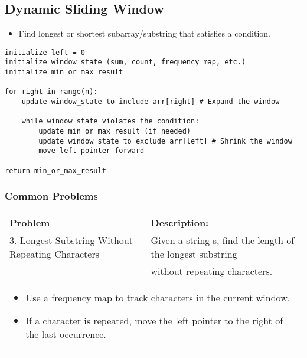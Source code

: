 \subsection{Dynamic Sliding Window}
\begin{summary}
    \begin{itemize}
        \item Find longest or shortest subarray/substring that satisfies a condition.
    \end{itemize}
\end{summary}

\begin{algo}
\begin{lstlisting}
initialize left = 0
initialize window_state (sum, count, frequency map, etc.)
initialize min_or_max_result

for right in range(n):
    update window_state to include arr[right] # Expand the window

    while window_state violates the condition:
        update min_or_max_result (if needed)
        update window_state to exclude arr[left] # Shrink the window
        move left pointer forward

return min_or_max_result
\end{lstlisting}
\end{algo}

\subsubsection{Common Problems}
\begin{summary}
    \begin{center}
        \begin{tabular}{ll}
            \toprule
            \textbf{Problem} & \textbf{Description:} \\
            \midrule
            3. Longest Substring Without Repeating Characters & Given a string s, find the length of the longest substring \\
            & without repeating characters. \\
            \multicolumn{2}{p{\linewidth}}{
                \begin{itemize}
                    \item Use a frequency map to track characters in the current window.
                    \item If a character is repeated, move the left pointer to the right of the last occurrence.
                \end{itemize}
            } \\
            \bottomrule
        \end{tabular}
    \end{center}
\end{summary}